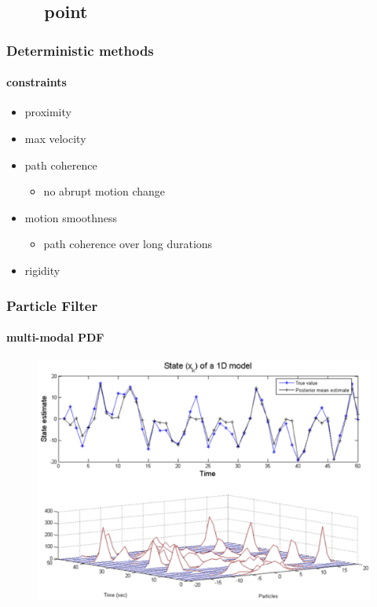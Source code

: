 \subsection{\ \ \ \ point}
\begin{frame}
\frametitle{Deterministic methods}
\framesubtitle{constraints}
\logoCSIPCPL\mypagenum
	\begin{itemize}
		\item proximity
		\item max velocity
		\item path coherence
			\begin{itemize}
				\item no abrupt motion change
			\end{itemize}
		\item motion smoothness
			\begin{itemize}
				\item path coherence over long durations
			\end{itemize}			
		\item rigidity
	\end{itemize}
\end{frame}


\begin{frame}
\frametitle{Particle Filter}
\framesubtitle{multi-modal PDF}
\logoCSIPCPL\mypagenum
	\begin{figure}
		\includegraphics[width=1.0\textwidth]{thesis/TRK_ParticleFilter_multimodalPDF.pdf}
	\end{figure}	
\end{frame}




